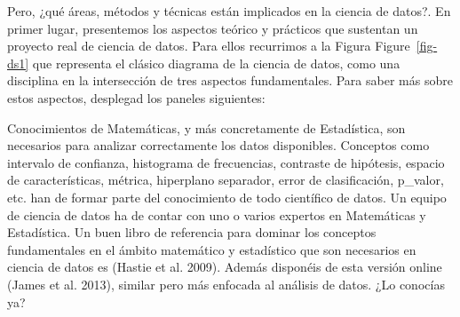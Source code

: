 \documentclass[
  letterpaper,
  DIV=11,
  numbers=noendperiod]{scrreprt}
\begin{document}
Pero, ¿qué áreas, métodos y técnicas están implicados en la ciencia de
datos?. En primer lugar, presentemos los aspectos teórico y prácticos
que sustentan un proyecto real de ciencia de datos. Para ellos
recurrimos a la Figura Figure~\ref{fig-ds1} que representa el clásico
diagrama de la ciencia de datos, como una disciplina en la intersección
de tres aspectos fundamentales. Para saber más sobre estos aspectos,
desplegad los paneles siguientes:

\begin{tcolorbox}[enhanced jigsaw, arc=.35mm, breakable, coltitle=black, left=2mm, opacityback=0, bottomtitle=1mm, colbacktitle=quarto-callout-note-color!10!white, title=\textcolor{quarto-callout-note-color}{\faInfo}\hspace{0.5em}{Matemáticas y Estadística}, titlerule=0mm, colback=white, colframe=quarto-callout-note-color-frame, bottomrule=.15mm, rightrule=.15mm, opacitybacktitle=0.6, toptitle=1mm, toprule=.15mm, leftrule=.75mm]

Conocimientos de Matemáticas, y más concretamente de Estadística, son
necesarios para analizar correctamente los datos disponibles. Conceptos
como intervalo de confianza, histograma de frecuencias, contraste de
hipótesis, espacio de características, métrica, hiperplano separador,
error de clasificación, p\_valor, etc. han de formar parte del
conocimiento de todo científico de datos. Un equipo de ciencia de datos
ha de contar con uno o varios expertos en Matemáticas y Estadística. Un
buen libro de referencia para dominar los conceptos fundamentales en el
ámbito matemático y estadístico que son necesarios en ciencia de datos
es (Hastie et al. 2009). Además disponéis de esta versión online (James
et al. 2013), similar pero más enfocada al análisis de datos. ¿Lo
conocías ya?

\end{tcolorbox}
\end{document}

